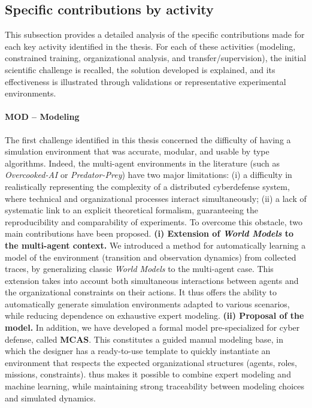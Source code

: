 \subsection*{Specific contributions by activity}
This subsection provides a detailed analysis of the specific contributions made for each key activity identified in the thesis. For each of these activities (modeling, constrained training, organizational analysis, and transfer/supervision), the initial scientific challenge is recalled, the solution developed is explained, and its effectiveness is illustrated through validations or representative experimental environments.
\paragraph{MOD – Modeling}
The first challenge identified in this thesis concerned the difficulty of having a simulation environment that was accurate, modular, and usable by  type algorithms.
Indeed, the multi-agent environments in the literature (such as \textit{Overcooked-AI} or \textit{Predator-Prey}) have two major limitations:
(i) a difficulty in realistically representing the complexity of a distributed cyberdefense system, where technical and organizational processes interact simultaneously;
(ii) a lack of systematic link to an explicit theoretical formalism, guaranteeing the reproducibility and comparability of experiments.
To overcome this obstacle, two main contributions have been proposed.
\medskip
\noindent
\textbf{(i) Extension of \textit{World Models} to the multi-agent context.}
We introduced a method for automatically learning a model of the environment (transition and observation dynamics) from collected traces, by generalizing classic \textit{World Models} to the multi-agent case.
This extension takes into account both simultaneous interactions between agents and the organizational constraints on their actions.
It thus offers the ability to automatically generate simulation environments adapted to various scenarios, while reducing dependence on exhaustive expert modeling.
\medskip
\noindent
\textbf{(ii) Proposal of the  model.}
In addition, we have developed a formal model  pre-specialized for cyber defense, called \textbf{MCAS}.
This constitutes a guided manual modeling base, in which the designer has a ready-to-use template to quickly instantiate an environment that respects the expected organizational structures (agents, roles, missions, constraints).
 thus makes it possible to combine expert modeling and machine learning, while maintaining strong traceability between modeling choices and simulated dynamics.
